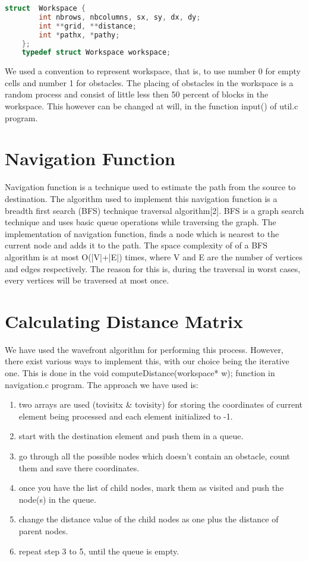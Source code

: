 \documentclass{report}
\begin{document}
	\begin{lstlisting}[language=C,frame=lines]
	struct  Workspace {
		int nbrows, nbcolumns, sx, sy, dx, dy;
		int **grid, **distance;
		int *pathx, *pathy;
	};
	typedef struct Workspace workspace;
	\end{lstlisting}
	
	We used a convention to represent workspace, that is, to use number \textsf{0} for empty cells and number \textsf{1} for obstacles. The placing of obstacles in the workspace is a random process and consist of little less then 50 percent of blocks in the workspace. This however can be changed at will, in the function \textsf{input()} of \textsf{util.c} program.

\section{Navigation Function}
	Navigation function is a technique used to estimate the path from the source to destination. The algorithm used to implement this navigation function is a breadth first search (BFS) technique traversal algorithm[2]. BFS is a graph search technique and uses basic queue operations while traversing the graph. The implementation of navigation function, finds a node which is nearest to the current node and adds it to the path. The space complexity of of a BFS algorithm is at most \textsf{O(|V|+|E|)} times, where V and E are the number of vertices and edges respectively. The reason for this is, during the traversal in worst cases, every vertices will be traversed at most once.
	
\section{Calculating Distance Matrix}
	We have used the \textsf{wavefront algorithm} for performing this process. However, there exist various ways to implement this, with our choice being the iterative one. This is done in the \textsf{void computeDistance(workspace* w);} function in \textsf{navigation.c} program. The approach we have used is:
	\begin{enumerate}
	\item two arrays are used (\textsf{tovisitx \& tovisity}) for storing the coordinates of current element being processed and each element initialized to -1.
	\item start with the destination element and push them in a queue.
	\item go through all the possible nodes which doesn't contain an obstacle, count them and save there coordinates.
	\item once you have the list of child nodes, mark them as visited and push the node(s) in the queue.
	\item change the distance value of the child nodes as one plus the distance of parent nodes.
	\item repeat step 3 to 5, until the queue is empty.
	\end{enumerate}
\end{document}
